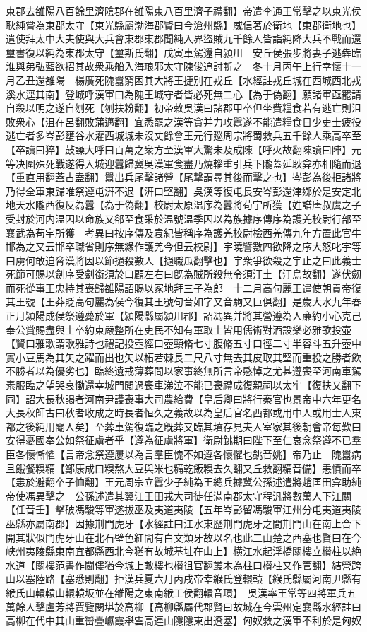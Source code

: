 東郡去雒陽八百餘里濟隂郡在雒陽東八百里濟子禮翻】帝遣李通王常擊之以東光侯耿純嘗為東郡太守【東光縣屬渤海郡賢曰今滄州縣】威信著於衛地【東郡衛地也】遣使拜太中大夫使與大兵會東郡東郡聞純入界盜賊九千餘人皆詣純降大兵不戰而還璽書復以純為東郡太守【璽斯氏翻】戊寅車駕還自潁川　安丘侯張步將妻子逃犇臨淮與弟弘藍欲招其故衆乘船入海琅邪太守陳俊追討斬之　冬十月丙午上行幸懷十一月乙丑還雒陽　楊廣死隗囂窮困其大將王捷别在戎丘【水經註戎丘城在西城西北戎溪水逕其南】登城呼漢軍曰為隗王城守者皆必死無二心【為于偽翻】願諸軍亟罷請自殺以明之遂自刎死【刎扶粉翻】初帝敕吳漢曰諸郡甲卒但坐費糧食若有逃亡則沮敗衆心【沮在呂翻敗蒲邁翻】宜悉罷之漢等貪并力攻囂遂不能遣糧食日少吏士疲役逃亡者多岑彭壅谷水灌西城城未沒丈餘會王元行廵周宗將蜀救兵五千餘人乘高卒至【卒讀曰猝】鼔譟大呼曰百萬之衆方至漢軍大驚未及成陳【呼火故翻陳讀曰陣】元等决圍殊死戰遂得入城迎囂歸冀吳漢軍食盡乃燒輜重引兵下隴蓋延耿弇亦相隨而退【重直用翻蓋古盍翻】囂出兵尾擊諸營【尾撃謂尋其後而擊之也】岑彭為後拒諸將乃得全軍東歸唯祭遵屯汧不退【汧口堅翻】吳漢等復屯長安岑彭還津鄉於是安定北地天水隴西復反為囂【為于偽翻】校尉太原温序為囂將苟宇所獲【姓譜唐叔虞之子受封於河内温因以命族又郤至食采於温號温季因以為族據序傳序為護羌校尉行部至襄武為苟宇所獲　考異曰按序傳及袁紀皆稱序為護羌校尉檢西羌傳九年方置此官牛邯為之又云邯卒職省則序無緣作護羌今但云校尉】宇曉譬數四欲降之序大怒叱宇等曰虜何敢迫脅漢將因以節撾殺數人【撾職瓜翻擊也】宇衆爭欲殺之宇止之曰此義士死節可賜以劍序受劍銜須於口顧左右曰旣為賊所殺無令須汙土【汙烏故翻】遂伏劒而死從事王忠持其喪歸雒陽詔賜以冢地拜三子為郎　十二月高句麗王遣使朝貢帝復其王號【王莽貶高句麗為侯今復其王號句音如字又音駒又巨俱翻】是歲大水九年春正月潁陽成侯祭遵薨於軍【潁陽縣屬潁川郡】詔馮異并將其營遵為人亷約小心克己奉公賞賜盡與士卒約束嚴整所在吏民不知有軍取士皆用儒術對酒設樂必雅歌投壺【賢曰雅歌謂歌雅詩也禮記投壺經曰壺頸脩七寸腹脩五寸口徑二寸半容斗五升壺中實小豆馬為其矢之躍而出也矢以柘若棘長二尺八寸無去其皮取其堅而重投之勝者飲不勝者以為優劣也】臨終遺戒薄葬問以家事終無所言帝愍悼之尤甚遵喪至河南車駕素服臨之望哭哀慟還幸城門閲過喪車涕泣不能已喪禮成復親祠以太牢【復扶又翻下同】詔大長秋謁者河南尹護喪事大司農給費【皇后卿曰將行秦官也景帝中六年更名大長秋師古曰秋者收成之時長者恒久之義故以為皇后官名西都或用中人或用士人東都之後純用閹人矣】至葬車駕復臨之旣葬又臨其墳存見夫人室家其後朝會帝每歎曰安得憂國奉公如祭征虜者乎【遵為征虜將軍】衛尉銚期曰陛下至仁哀念祭遵不已羣臣各懷慚懼【言帝念祭遵屢以為言羣臣愧不如遵各懷懼也銚音姚】帝乃止　隗囂病且餓餐糗糒【鄭康成曰糗熬大豆與米也糒乾飯糗去久翻又丘救翻糒音備】恚憤而卒【恚於避翻卒子恤翻】王元周宗立囂少子純為王總兵據冀公孫述遣將趙匡田弇助純帝使馮異擊之　公孫述遣其翼江王田戎大司徒任滿南郡太守程汎將數萬人下江關【任音壬】擊破馮駿等軍遂拔巫及夷道夷陵【五年岑彭留馮駿軍江州分屯夷道夷陵巫縣亦屬南郡】因據荆門虎牙【水經註曰江水東歷荆門虎牙之間荆門山在南上合下開其狀似門虎牙山在北石壁色紅間有白文類牙故以名也此二山楚之西塞也賢曰在今峡州夷陵縣東南宜都縣西北今猶有故城基址在山上】横江水起浮橋關樓立櫕柱以絶水道【關樓范書作闘僂猶今城上敵樓也櫕徂官翻叢木為柱曰櫕柱又作管翻】結營跨山以塞陸路【塞悉則翻】拒漢兵夏六月丙戌帝幸緱氏登轘轅【緱氏縣屬河南尹縣有緱氏山轘轅山轘轅坂並在雒陽之東南緱工侯翻轘音環】　吳漢率王常等四將軍兵五萬餘人擊盧芳將賈覽閔堪於高柳【高柳縣屬代郡賢曰故城在今雲州定襄縣水經註曰高柳在代中其山重巒疊巘霞舉雲高連山隱隱東出遼塞】匈奴救之漢軍不利於是匈奴